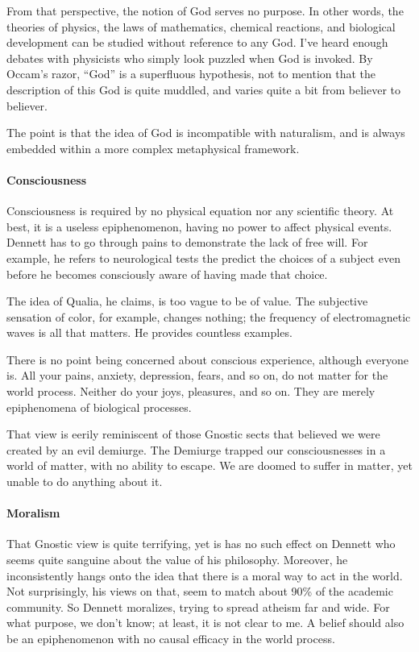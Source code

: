 From that perspective, the notion of God serves no purpose. In other words, the theories of physics, the laws of mathematics, chemical reactions, and biological development can be studied without reference to any God. I've heard enough debates with physicists who simply look puzzled when God is invoked. By Occam's razor, ``God'' is a superfluous hypothesis, not to mention that the description of this God is quite muddled, and varies quite a bit from believer to believer.

The point is that the idea of God is incompatible with naturalism, and is always embedded within a more complex metaphysical framework.

\paragraph{Consciousness}


Consciousness is required by no physical equation nor any scientific theory. At best, it is a useless epiphenomenon, having no power to affect physical events. Dennett has to go through pains to demonstrate the lack of free will. For example, he refers to neurological tests the predict the choices of a subject even before he becomes consciously aware of having made that choice.

The idea of Qualia, he claims, is too vague to be of value. The subjective sensation of color, for example, changes nothing; the frequency of electromagnetic waves is all that matters. He provides countless examples.

There is no point being concerned about conscious experience, although everyone is. All your pains, anxiety, depression, fears, and so on, do not matter for the world process. Neither do your joys, pleasures, and so on. They are merely epiphenomena of biological processes.

That view is eerily reminiscent of those Gnostic sects that believed we were created by an evil demiurge. The Demiurge trapped our consciousnesses in a world of matter, with no ability to escape. We are doomed to suffer in matter, yet unable to do anything about it.

\paragraph{Moralism}


That Gnostic view is quite terrifying, yet is has no such effect on Dennett who seems quite sanguine about the value of his philosophy. Moreover, he inconsistently hangs onto the idea that there is a moral way to act in the world. Not surprisingly, his views on that, seem to match about 90\% of the academic community. So Dennett moralizes, trying to spread atheism far and wide. For what purpose, we don't know; at least, it is not clear to me. A belief should also be an epiphenomenon with no causal efficacy in the world process.


